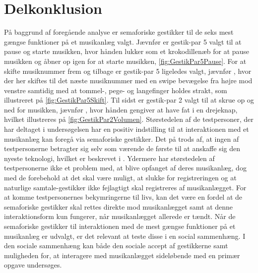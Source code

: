 \section{Delkonklusion}
\label{ValgAfGestikkerDelkonklusion}
%
På baggrund af foregående analyse er semaforiske gestikker til de seks mest gængse funktioner på et musikanlæg valgt. Jævnfør  er gestik-par 5 valgt til at pause og starte musikken, hvor hånden lukker som et krokodillenæb for at pause musikken og åbner op igen for at starte musikken, \autoref{fig:GestikPar5Pause}. For at skifte musiknummer frem og tilbage er gestik-par 5 ligeledes valgt, jævnfør , hvor der her skiftes til det næste musiknummer med en swipe bevægelse fra højre mod venstre samtidig med at tommel-, pege- og langefinger holdes strakt, som illustreret på \autoref{fig:GestikPar5Skift}. Til sidst er gestik-par 2 valgt til at skrue op og ned for musikken, jævnfør , hvor hånden gengiver at have fat i en drejeknap, hvilket illustreres på \autoref{fig:GestikPar2Volumen}. Størstedelen af de testpersoner, der har deltaget i undersøgelsen har en positiv indstilling til at interaktionen med et musikanlæg kan foregå via semaforiske gestikker. Det på trods af, at ingen af testpersonerne betragter sig selv som værende de første til at anskaffe sig den nyeste teknologi, hvilket er beskrevet i . Ydermere har størstedelen af testpersonerne ikke et problem med, at blive opfanget af deres musikanlæg, dog med de forebehold at det skal være muligt, at slukke for registreringen og at naturlige samtale-gestikker ikke fejlagtigt skal registreres af musikanlægget. For at komme testpersonernes bekymringerne til livs, kan det være en fordel at de semaforiske gestikker skal rettes direkte mod musikanlægget samt at denne interaktionsform kun fungerer, når musikanlægget allerede er tændt. \blankline
%
Når de semaforiske gestikker til interaktionen med de mest gængse funktioner på et musikanlæg er udvalgt, er det relevant at teste disse i en social sammenhæng. I den sociale sammenhæng kan både den sociale accept af gestikkerne samt muligheden for, at interagere med musikanlægget sideløbende med en primær opgave undersøges. 